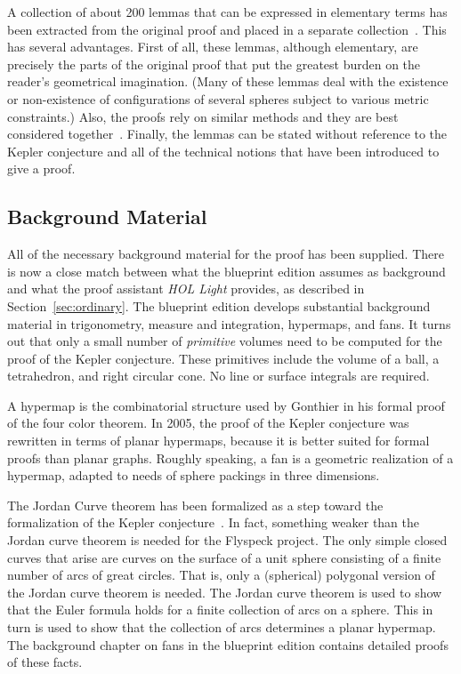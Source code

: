 \documentclass[11pt]{amsart}
\begin{document}
A collection of about 200 lemmas that can be expressed in elementary terms has been extracted from 
the original proof and placed in a separate collection~\cite{hales:2008:collection}.  This has
several advantages.  First of all, these lemmas, although elementary, are precisely the parts of the
original proof that put the greatest burden on the reader's geometrical imagination.  (Many of these
lemmas deal with the existence or non-existence of configurations of several spheres subject to
various metric constraints.)  Also, the proofs rely on similar methods and they are best considered
together~\cite{MethodsXX}.  
Finally, the lemmas can be stated without reference to the Kepler conjecture and all of the
technical notions that have been introduced to give a proof.

\subsection*{Background Material}

All of the necessary background material for the proof has been supplied.  There is now a close
match between what the blueprint edition assumes as background and what the proof assistant {\it HOL Light}
provides, as described in Section~\ref{sec:ordinary}.  The blueprint edition develops 
substantial background
material in trigonometry, measure and integration, hypermaps, and fans.   It turns out
that only a small number of {\it primitive} volumes need to be computed for the proof of the Kepler
conjecture. These primitives include the volume of a ball, a tetrahedron, and right circular cone.  
No line or surface integrals are required.

A hypermap is the
combinatorial structure used by Gonthier in his formal proof of the four color theorem.  In 2005,
the proof of the Kepler conjecture was rewritten in terms of planar hypermaps, because it is better suited
for formal proofs than planar graphs.  Roughly speaking, a fan is a geometric realization of a hypermap,
adapted to needs of sphere packings in three dimensions.

The Jordan Curve theorem has been formalized as a step toward the formalization of the Kepler
conjecture~\cite{Hales:2008:JCT:XX}.  In fact, something weaker than the Jordan curve theorem
is needed for the Flyspeck project.  The only simple closed curves that arise are curves on
the surface of a unit sphere consisting of a finite number of arcs of great circles.  That is,
only a (spherical) polygonal version of the Jordan curve theorem is needed.  The Jordan curve
theorem is used to show that the Euler formula holds for a finite collection of arcs on a
sphere.  This in turn is used to show that the collection of arcs determines a planar hypermap.
The background chapter on fans in the blueprint edition contains detailed proofs of these facts.
\end{document}
